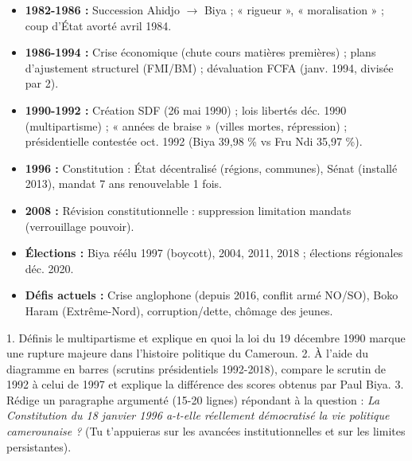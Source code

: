 \documentclass[11pt]{article}
\begin{document}
\begin{aretenir}
\begin{itemize}
\item \textbf{1982-1986 :} Succession Ahidjo $\to$ Biya ; « rigueur », « moralisation » ; coup d'État avorté avril 1984.
\item \textbf{1986-1994 :} Crise économique (chute cours matières premières) ; plans d'ajustement structurel (FMI/BM) ; dévaluation FCFA (janv. 1994, divisée par 2).
\item \textbf{1990-1992 :} Création SDF (26 mai 1990) ; lois libertés déc. 1990 (multipartisme) ; « années de braise » (villes mortes, répression) ; présidentielle contestée oct. 1992 (Biya 39,98 \% vs Fru Ndi 35,97 \%).
\item \textbf{1996 :} Constitution : État décentralisé (régions, communes), Sénat (installé 2013), mandat 7 ans renouvelable 1 fois.
\item \textbf{2008 :} Révision constitutionnelle : suppression limitation mandats (verrouillage pouvoir).
\item \textbf{Élections :} Biya réélu 1997 (boycott), 2004, 2011, 2018 ; élections régionales déc. 2020.
\item \textbf{Défis actuels :} Crise anglophone (depuis 2016, conflit armé NO/SO), Boko Haram (Extrême-Nord), corruption/dette, chômage des jeunes.
\end{itemize}
\end{aretenir}

\begin{exercice}
1. Définis le multipartisme et explique en quoi la loi du 19 décembre 1990 marque une rupture majeure dans l'histoire politique du Cameroun.
2. À l'aide du diagramme en barres (scrutins présidentiels 1992-2018), compare le scrutin de 1992 à celui de 1997 et explique la différence des scores obtenus par Paul Biya.
3. Rédige un paragraphe argumenté (15-20 lignes) répondant à la question : \emph{La Constitution du 18 janvier 1996 a-t-elle réellement démocratisé la vie politique camerounaise ?} (Tu t'appuieras sur les avancées institutionnelles et sur les limites persistantes).
\end{exercice}
\end{document}
